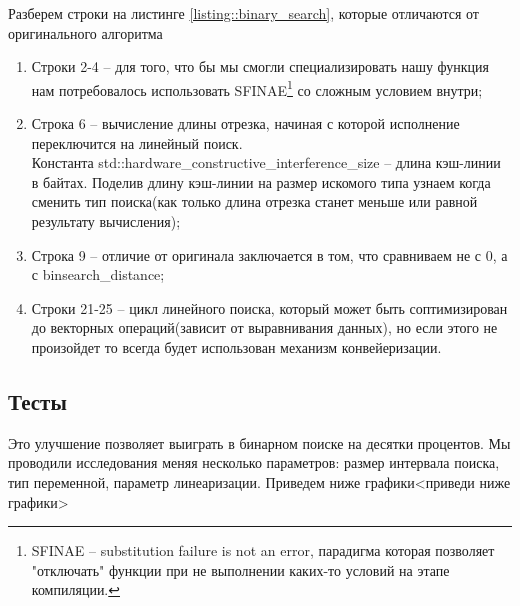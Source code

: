 \newpage
Разберем строки на листинге \ref{listing::binary_search}, которые отличаются от оригинального алгоритма
\begin{enumerate}
    \item{Строки 2-4 -- для того, что бы мы смогли специализировать нашу функция нам потребовалось использовать SFINAE\footnote{SFINAE -- substitution failure is not an error, парадигма которая позволяет "отключать" функции при не выполнении каких-то условий на этапе компиляции.} со сложным условием внутри;}
    \item{Строка 6 -- вычисление длины отрезка, начиная с которой исполнение переключится на линейный поиск. \\
    Константа std::hardware\_constructive\_interference\_size -- длина кэш-линии в байтах. Поделив длину кэш-линии на размер искомого типа узнаем когда сменить тип поиска(как только длина отрезка станет меньше или равной результату вычисления);}
    \item{Строка 9 -- отличие от оригинала заключается в том, что сравниваем не с 0, а с binsearch\_distance;}
    \item{Строки 21-25 -- цикл линейного поиска, который может быть соптимизирован до векторных операций(зависит от выравнивания данных), но если этого не произойдет то всегда будет использован механизм конвейеризации.}
\end{enumerate}
\subsection{Тесты}
Это улучшение позволяет выиграть в бинарном поиске на десятки процентов. Мы проводили исследования меняя несколько параметров: размер интервала поиска, тип переменной, параметр линеаризации. Приведем ниже графики<приведи ниже графики>